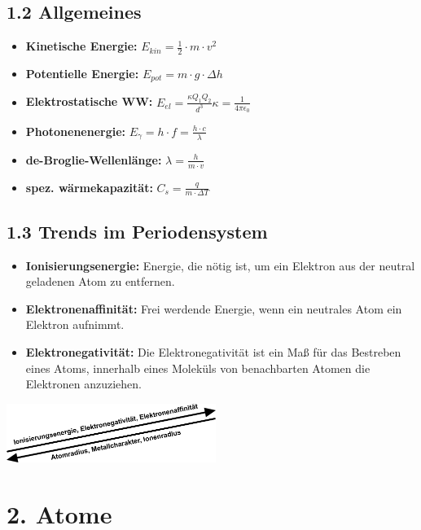 \begin{multicols*}{4}
\subsection{1.2 Allgemeines}{

    \begin{itemize}[noitemsep, leftmargin=*]
        \item \textbf{Kinetische Energie:} $E_{kin} = \frac{1}{2} \cdot m \cdot v^2$
        \item \textbf{Potentielle Energie:} $E_{pot} = m \cdot g \cdot \Delta h$
        \item \textbf{Elektrostatische WW:} $E_{el}=\frac{\kappa Q_1Q_2}{d^3}$\quad $\kappa = \frac{1}{4\pi \epsilon_0}$
        \item \textbf{Photonenenergie: } $E_\gamma = h\cdot f = \frac{h\cdot c}{\lambda}$
        \item \textbf{de-Broglie-Wellenlänge: } $\lambda = \frac{h}{m\cdot v}$
        \item \textbf{spez. wärmekapazität: }$C_s=\frac{q}{m\cdot\Delta T}$
    \end{itemize}
}


\subsection{1.3 Trends im Periodensystem}{
\begin{itemize}[noitemsep, leftmargin=*]
    \item \textbf{Ionisierungsenergie: }Energie, die nötig ist, um ein Elektron aus der neutral geladenen Atom zu entfernen.
    \item \textbf{Elektronenaffinität:} Frei werdende Energie, wenn ein neutrales Atom ein Elektron aufnimmt.
    \item \textbf{Elektronegativität:} Die Elektronegativität ist ein Maß für das Bestreben eines Atoms, innerhalb eines Moleküls von benachbarten Atomen die Elektronen anzuziehen.

    
\end{itemize}\includegraphics[width = 68mm]{Bilder/TrendsimPSE.png}
}

\section{2. Atome}

\end{multicols*}
